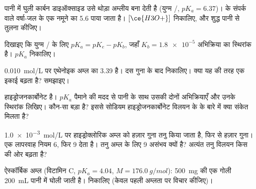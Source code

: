 \begin{exercise}[$\star\star$]\label{exo:g12:ka-and-pka:10}
पानी में घुली कार्बन डाइऑक्साइड उसे थोड़ा अम्लीय बना देती है (युग्म
/, $pK_a = 6.37$)।  के संपर्क वाले वर्षा-जल के एक नमूने का
 5.6 पाया जाता है। $[\ce{H3O+}]$ निकालिए, और शुद्ध पानी से तुलना कीजिए।
\end{exercise}

\begin{exercise}[$\star\star$]\label{exo:g12:ka-and-pka:11}
दिखाइए कि युग्म / के लिए $pK_a = pK_e - pK_b$, जहाँ
$K_b = \num{1.8e-5}$ अभिक्रिया  का स्थिरांक है।
$pK_a$ निकालिए।
\end{exercise}

\begin{exercise}[$\star\star\star$]\label{exo:g12:ka-and-pka:12}
\qty{0.010}{mol/L} पर एथेनोइक अम्ल का  3.39 है। दस गुना  के बाद
 निकालिए। क्या यह  की तरह एक इकाई बढ़ता है?
समझाइए।
\end{exercise}

\begin{exercise}[$\star\star\star$]\label{exo:g12:ka-and-pka:13}
हाइड्रोजनकार्बोनेट   है। $pK_a$ पैमाने की मदद से पानी के साथ उसकी दोनों
अभिक्रियाएँ और उनके स्थिरांक लिखिए। कौन-सा बड़ा है?
इससे सोडियम हाइड्रोजनकार्बोनेट विलयन के  के बारे में क्या संकेत
मिलता है?
\end{exercise}

\begin{exercise}[$\star\star\star$]\label{exo:g12:ka-and-pka:14}
\qty{1.0e-3}{mol/L} पर हाइड्रोक्लोरिक अम्ल को हज़ार गुना तनु किया जाता है,
फिर से हज़ार गुना। एक लापरवाह नियम  6, फिर  9 देता है। तनु अम्ल के लिए
 9 असंभव क्यों है? अत्यंत तनु विलयन किस  की ओर
बढ़ता है?
\end{exercise}

\begin{exercise}[$\star\star\star$]\label{exo:g12:ka-and-pka:15}
ऐस्कॉर्बिक अम्ल (विटामिन C, $pK_a = 4.04$, $M = \qty{176.0}{g/mol}$): \qty{500}{mg} की
एक गोली \qty{200}{mL} पानी में घोली जाती है। 
निकालिए (केवल पहली अम्लता पर विचार कीजिए)।
\end{exercise}

